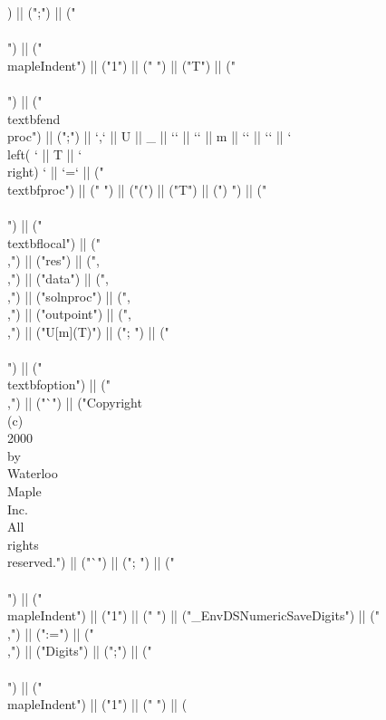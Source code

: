 \documentclass{article}
\begin{document}
\begin{center}
\begin{maplelatex}
{) || (";") || ("\\\\\n") || ("\\mapleIndent{") || ("1") || ("} ") || ("T") || ("\\\\\n") || ("\\textbf{end\\ proc}") || (";") || `,` || U || _ || `{` || `{` || m || `}` || `}` || ` \\left( ` || T || ` \\right) ` || `=` || ("\\textbf{proc}") || (" ") || ("(") || ("T") || (") ") || ("\\\\\n") || ("\\textbf{local}") || (" \\,") || ("res") || (",\\,") || ("data") || (",\\,") || ("solnproc") || (",\\,") || ("outpoint") || (",\\,") || ("U[m](T)") || ("; ") || ("\\\\\n") || ("\\textbf{option}") || (" \\,") || ("`") || ("Copyright\\ (c)\\ 2000\\ by\\ Waterloo\\ Maple\\ Inc.\\ All\\ rights\\ reserved.") || ("`") || ("; ") || ("\\\\\n") || ("\\mapleIndent{") || ("1") || ("} ") || ("_EnvDSNumericSaveDigits") || ("\\,") || (":=") || ("\\,") || ("Digits") || (";") || ("\\\\\n") || ("\\mapleIndent{") || ("1") || ("} ") || (}
\end{maplelatex}
\end{center}
\end{document}
